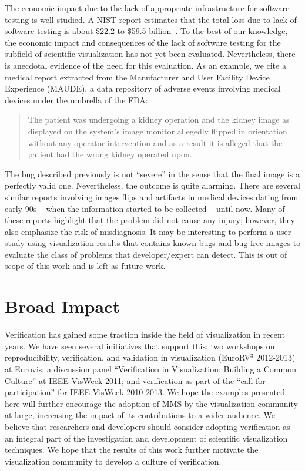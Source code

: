 The economic impact due to the lack of appropriate infrastructure for software testing is well studied.
%
A NIST report estimates that the total loss due to lack of software testing is about \$22.2 to \$59.5 billion~\cite{tassey2002economic}. 
%
To the best of our knowledge, the economic impact and consequences of the lack of software testing for the subfield of scientific visualization has not yet been evaluated. 
%
Nevertheless, there is anecdotal evidence of the need for this evaluation. As an example, we cite a medical report extracted from the Manufacturer and User Facility Device Experience (MAUDE), a data repository of adverse events involving medical devices under the umbrella of the FDA:

{\singlespace
\begin{quote}
The patient was undergoing a kidney operation and the kidney image as displayed on the system's image monitor allegedly flipped in orientation without any operator intervention and as a result it is alleged that the patient had the wrong kidney operated upon.
\end{quote}}
The bug described previously is not  ``severe'' in the sense that the final image is a perfectly valid one. Nevertheless, the outcome is quite alarming. There are several similar reports involving images flips and artifacts in medical devices dating from early 90s -- when the information started to be collected -- until now. Many of these reports highlight that the problem did not cause any injury; however, they also emphasize the risk of misdiagnosis.
%
It may be interesting to perform a user study using visualization results that contains known bugs and bug-free images to evaluate the class of problems that developer/expert can detect.  This is out of scope of this work and is left as future work.


\section{Broad Impact}

Verification has gained some traction inside the field of visualization in recent years.  
%
We have seen several initiatives that support this: two workshops on reproducibility, verification, and validation in visualization (EuroRV$^3$ 2012-2013) at Eurovis; a discussion panel ``Verification in Visualization: Building a Common Culture'' at IEEE VisWeek 2011; and verification as part of the ``call for participation'' for IEEE VisWeek 2010-2013.
%
We hope the  examples presented here will further encourage the adoption of MMS by the visualization community at large, increasing the impact of its contributions  to a wider audience.
%
We believe that researchers and developers should consider adopting verification as an integral part of the investigation and development of scientific visualization techniques.
%
We hope that the results of this work further motivate the visualization
community to develop a culture of verification.



